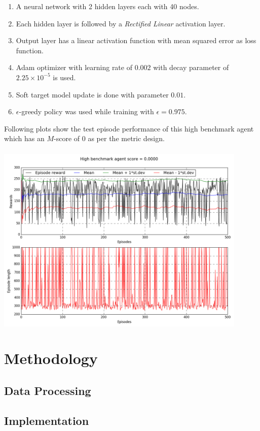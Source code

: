 \documentclass{svproc}
\begin{document}
\vspace{-0.2cm}
\begin{enumerate}
	\item A neural network with 2 hidden layers each with 40 nodes.
	\item Each hidden layer is followed by a \textit{Rectified Linear} activation layer.
	\item Output layer has a linear activation function with mean squared error as loss function.
	\item Adam optimizer with learning rate of $0.002$ with decay parameter of $2.25\times10^{-5}$ is used.
	\item Soft target model update is done with parameter $0.01$.
	\item $\epsilon$-greedy policy was used while training with $\epsilon = 0.975$.
\end{enumerate}
Following plots show the test episode performance of this high benchmark agent which has an $M$-score of $0$ as per the metric design.\\\\
\includegraphics[width=12cm,trim={0 0 0 0},clip]{img/highbenchmark_test_evaluation}\\
\section{Methodology}
\subsection*{Data Processing}
\subsection*{Implementation}
\end{document}
